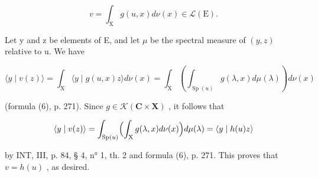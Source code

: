 \[
v = \int_ {\mathrm{X}} g (u, x) d \nu (x) \in \mathscr {L} (\mathrm{E}).
\]

Let y and z be elements of E, and let \(\mu\) be the spectral measure of \((y, z)\) relative to u. We have

\[
\langle y \mid v (z) \rangle = \int_ {\mathrm{X}} \langle y \mid g (u, x) z \rangle d \nu (x) = \int_ {\mathrm{X}} \left(\int_ {\operatorname{Sp} (u)} g (\lambda , x) d \mu (\lambda)\right) d \nu (x)
\]

(formula (6), p. 271). Since \(g \in \mathcal{K}(\mathbf{C} \times \mathbf{X})\) , it follows that

\[
\langle y \mid v (z) \rangle = \int_ {\operatorname{Sp} (u)} \Bigl (\int_ {\mathrm{X}} g (\lambda , x) d \nu (x) \Bigr) d \mu (\lambda) = \langle y \mid h (u) z \rangle
\]

by INT, III, p. 84, § 4, n° 1, th. 2 and formula (6), p. 271. This proves that \(v = h(u)\) , as desired.

